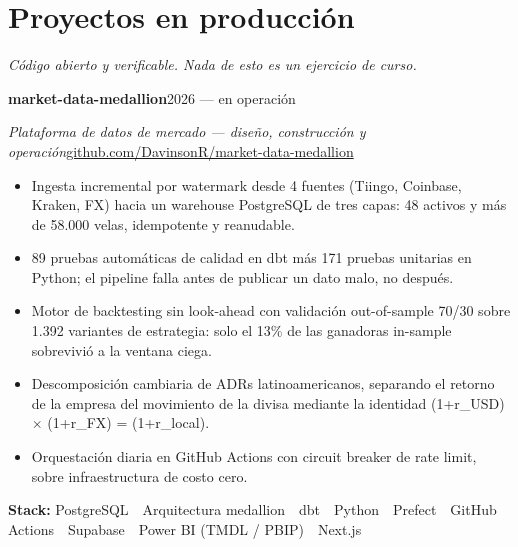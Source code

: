\documentclass[a4paper,10pt]{article}
\newcommand{\headline}[2]{\needspace{3\baselineskip}\textbf{\color{ink}#1}\hfill{\small #2}\par}
\newcommand{\subline}[2]{\textit{#1}\hfill{\small #2}\par}
\begin{document}
\section*{Proyectos en producción}
{\small\itshape Código abierto y verificable. Nada de esto es un ejercicio de curso.}\par\vspace{3pt}
\headline{market-data-medallion}{2026 --- en operación}
\subline{Plataforma de datos de mercado --- diseño, construcción y operación}{\href{https://github.com/DavinsonR/market-data-medallion}{github.com/DavinsonR/market-data-medallion}}
\begin{itemize}[leftmargin=1.1em, itemsep=0pt, topsep=1pt, parsep=0pt]
  \item Ingesta incremental por watermark desde 4 fuentes (Tiingo, Coinbase, Kraken, FX) hacia un warehouse PostgreSQL de tres capas: 48 activos y más de 58.000 velas, idempotente y reanudable.
  \item 89 pruebas automáticas de calidad en dbt más 171 pruebas unitarias en Python; el pipeline falla antes de publicar un dato malo, no después.
  \item Motor de backtesting sin look-ahead con validación out-of-sample 70/30 sobre 1.392 variantes de estrategia: solo el 13\% de las ganadoras in-sample sobrevivió a la ventana ciega.
  \item Descomposición cambiaria de ADRs latinoamericanos, separando el retorno de la empresa del movimiento de la divisa mediante la identidad (1+r\_USD) $\times$ (1+r\_FX) = (1+r\_local).
  \item Orquestación diaria en GitHub Actions con circuit breaker de rate limit, sobre infraestructura de costo cero.
\end{itemize}
{\small\textbf{Stack:} PostgreSQL \,\textperiodcentered\, Arquitectura medallion \,\textperiodcentered\, dbt \,\textperiodcentered\, Python \,\textperiodcentered\, Prefect \,\textperiodcentered\, GitHub Actions \,\textperiodcentered\, Supabase \,\textperiodcentered\, Power BI (TMDL / PBIP) \,\textperiodcentered\, Next.js}\par
\vspace{4pt}
\end{document}
